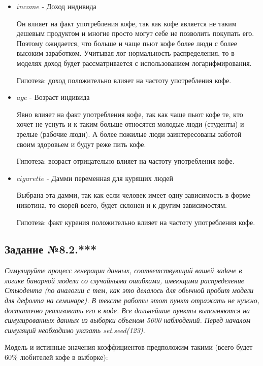 \documentclass[a4paper,12pt]{article}
\begin{document}
	\begin{itemize}
		\item $income$  - Доход индивида 
		
		Он влияет на факт употребления кофе, так как кофе является не таким дешевым продуктом и многие просто могут себе не позволить покупать его. Поэтому ожидается, что больше и чаще пьют кофе более люди с более высоким заработком. Учитывая лог-нормальность распределения, то в моделях доход будет рассматривается с использованием логарифмирования.
		
		Гипотеза: доход положительно влияет на частоту употребления кофе.
		
		\item $age$  - Возраст индивида 
		
		Явно влияет на факт употребления кофе, так как чаще пьют кофе те, кто хочет не уснуть и к таким больше относятся молодые люди (студенты) и зрелые (рабочие люди). А более пожилые люди заинтересованы заботой своим здоровьем и будут реже пить кофе.
		
		Гипотеза: возраст отрицательно влияет на частоту употребления кофе.
		
		\item $cigarette$ - Дамми переменная для курящих людей
		
		Выбрана эта дамми, так как если человек имеет одну зависимость в форме никотина, то скорей всего, будет склонен и к другим зависимостям.
		
		Гипотеза: факт курения положительно влияет на частоту употребления кофе.
		
	\end{itemize}
	
	\subsection{Задание №8.2.***}
	\textit{
	Симулируйте процесс генерации данных, соответствующий вашей задаче в логике бинарной модели со случайными ошибками, имеющими распределение Стьюдента (по аналогии с тем, как это делалось для обычной пробит модели для дефолта на семинаре). В тексте работы этот пункт отражать не нужно, достаточно реализовать его в коде. Все дальнейшие пункты выполняются на симулированных данных из выборки объемом 5000 наблюдений. Перед началом симуляций необходимо указать set.seed(123). 
}

	\vspace{0.2cm}
	
	Модель и истинные значения коэффициентов предположим такими (всего будет 60\% любителей кофе в выборке):
	
\end{document}
